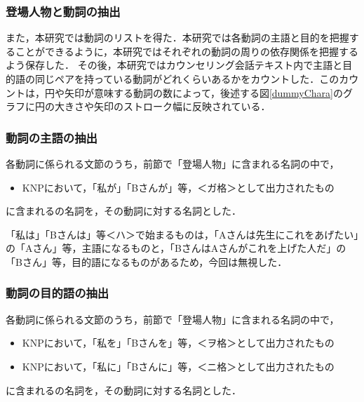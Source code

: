 \documentclass[shuuron]{kuee}
\begin{document}
\subsubsection{登場人物と動詞の抽出}

また，本研究では動詞のリストを得た．本研究では各動詞の主語と目的を把握することができるように，本研究ではそれぞれの動詞の周りの依存関係を把握するよう保存した．
その後，本研究ではカウンセリング会話テキスト内で主語と目的語の同じペアを持っている動詞がどれくらいあるかをカウントした．このカウントは，円や矢印が意味する動詞の数によって，後述する図\ref{dummyChara}のグラフに円の大きさや矢印のストローク幅に反映されている．


\subsubsection{動詞の主語の抽出}


各動詞に係られる文節のうち，前節で「登場人物」に含まれる名詞の中で，

\begin{itemize}

  \item KNPにおいて，「私が」「Bさんが」等，＜ガ格＞として出力されたもの
\end{itemize}
に含まれるの名詞を，その動詞に対する名詞とした．

「私は」「Bさんは」等＜ハ＞で始まるものは，「Aさんは先生にこれをあげたい」の「Aさん」等，主語になるものと，「BさんはAさんがこれを上げた人だ」の「Bさん」等，目的語になるものがあるため，今回は無視した．

\subsubsection{動詞の目的語の抽出}


各動詞に係られる文節のうち，前節で「登場人物」に含まれる名詞の中で，

\begin{itemize}

  \item KNPにおいて，「私を」「Bさんを」等，＜ヲ格＞として出力されたもの
  \item KNPにおいて，「私に」「Bさんに」等，＜ニ格＞として出力されたもの
\end{itemize}
に含まれるの名詞を，その動詞に対する名詞とした．
\end{document}
